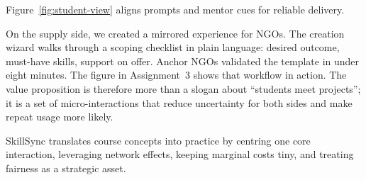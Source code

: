 Figure~\ref{fig:student-view} aligns prompts and mentor cues for reliable delivery.

On the supply side, we created a mirrored experience for NGOs. The creation wizard walks through a scoping checklist in plain language: desired outcome, must-have skills, support on offer. Anchor NGOs validated the template in under eight minutes. The figure in Assignment~3 shows that workflow in action. The value proposition is therefore more than a slogan about ``students meet projects''; it is a set of micro-interactions that reduce uncertainty for both sides and make repeat usage more likely.

SkillSync translates course concepts into practice by centring one core interaction, leveraging network effects, keeping marginal costs tiny, and treating fairness as a strategic asset.
